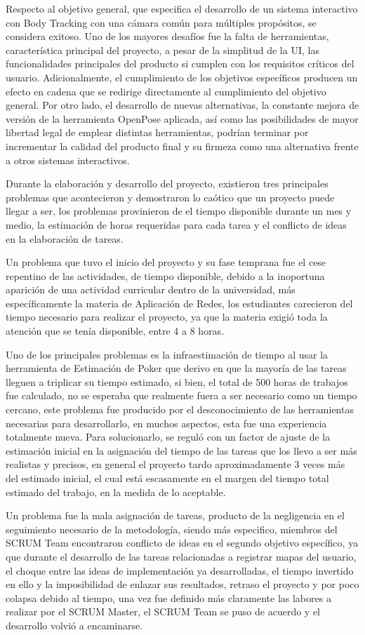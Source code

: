 Respecto al objetivo general, que especifica el desarrollo de un sistema interactivo con Body Tracking con una cámara común para múltiples propósitos, se considera exitoso. Uno de los mayores desafíos fue la falta de herramientas, característica principal del proyecto, a pesar de la simplitud de la UI, las funcionalidades principales del producto si cumplen con los requisitos críticos del usuario. Adicionalmente, el cumplimiento de los objetivos específicos producen un efecto en cadena que se redirige directamente al cumplimiento del objetivo general.
Por otro lado, el desarrollo de nuevas alternativas, la constante mejora de versión de la herramienta OpenPose aplicada, así como las posibilidades de mayor libertad legal de emplear distintas herramientas, podrían terminar por incrementar la calidad del producto final y su firmeza como una alternativa frente a otros sistemas interactivos.

Durante la elaboración y desarrollo del proyecto, existieron tres principales problemas que acontecieron y demostraron lo caótico que un proyecto puede llegar a ser, los problemas provinieron de el tiempo disponible durante un mes y medio, la estimación de horas requeridas para cada tarea y el conflicto de ideas en la elaboración de tareas.

Un problema que tuvo el inicio del proyecto y su fase temprana fue el cese repentino de las actividades, de tiempo disponible, debido a la inoportuna aparición de una actividad curricular dentro de la universidad, más específicamente la materia de Aplicación de Redes, los estudiantes carecieron del tiempo necesario para realizar el proyecto, ya que la materia exigió toda la atención que se tenía disponible, entre 4 a 8 horas.

Uno de los principales problemas es la infraestimación de tiempo al usar la herramienta de Estimación de Poker que derivo en que la mayoría de las tareas lleguen a triplicar su tiempo estimado, si bien, el total de 500 horas de trabajos fue calculado, no se esperaba que realmente fuera a ser necesario como un tiempo cercano, este problema fue producido por el desconocimiento de las herramientas necesarias para desarrollarlo, en muchos aspectos, esta fue una experiencia totalmente nueva. Para solucionarlo, se reguló con un factor de ajuste de la estimación inicial en la asignación del tiempo de las tareas que los llevo a ser más realistas y precisos, en general el proyecto tardo aproximadamente 3 veces más del estimado inicial, el cual está escasamente en el margen del tiempo total estimado del trabajo, en la medida de lo aceptable.

Un problema fue la mala asignación de tareas, producto de la negligencia en el seguimiento necesario de la metodología, siendo más especifico, miembros del SCRUM Team encontraron conflicto de ideas en el segundo objetivo específico, ya que durante el desarrollo de las tareas relacionadas a registrar mapas del usuario, el choque entre las ideas de implementación ya desarrolladas, el tiempo invertido en ello y la imposibilidad de enlazar sus resultados, retraso el proyecto y por poco colapsa debido al tiempo, una vez fue definido más claramente las labores a realizar por el SCRUM Master, el SCRUM Team se puso de acuerdo y el desarrollo volvió a encaminarse.

